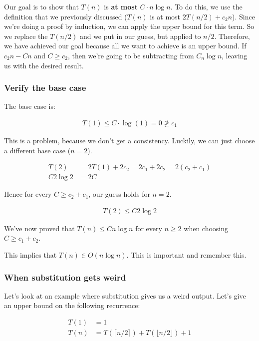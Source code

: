\documentclass[11pt,a4paper,titlepage,dvipsnames,cmyk]{scrartcl}
\begin{document}
Our goal is to show that $T(n)$ is \textbf{at most} $C \cdot n \log n$. To
do this, we use the definition that we previously discussed ($T(n)$ is at
most $2T(n/2) + c_2n$). Since we're doing a proof by induction, we can apply
the upper bound for this term. So we replace the $T(n/2)$ and we put in
our guess, but applied to $n/2$. Therefore, we have achieved our goal
because all we want to achieve is an upper bound. If $c_2n - Cn$ and $C
\ge c_2$, then we're going to be subtracting from $C_n \log n$, leaving us
with the desired result.

\subsubsection{Verify the base case}%
\label{ssub:Verify the base case}
The base case is:

\begin{align*}
    T(1) \le C \cdot \log (1) = 0 \not \ge c_1
\end{align*}

This is a problem, because we don't get a consistency. Luckily, we can
just choose a different base case ($n = 2$).

\begin{align*}
    T(2) &= 2T(1) + 2c_2 = 2c_1 + 2c_2 = 2(c_2 + c_1) \\
    C2 \log 2 &= 2C
\end{align*}

Hence for every $C \ge c_2 + c_1$, our guess holds for $n = 2$. 

\begin{align*}
    T(2) \le C2 \log 2
\end{align*}

We've now proved that $T(n) \le Cn \log n$ for every $n \ge 2$ when
choosing $C \ge c_1 + c_2$.

This implies that $T(n) \in O(n \log n)$. This is important and remember
this.

\subsubsection{When substitution gets weird}%
\label{ssub:When substitution gets weird}
Let's look at an example where substitution gives us a weird output. Let's
give an upper bound on the following recurrence:

\begin{align*}
    T(1) &= 1 \\
    T(n) &= T(\lceil n/2 \rceil) + T(\lfloor n/2 \rfloor) + 1
\end{align*}
\end{document}
